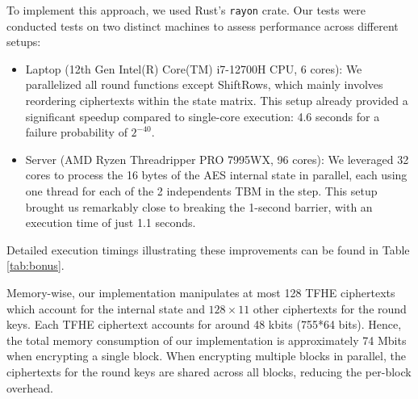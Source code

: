 To implement this approach, we used Rust's \texttt{rayon} crate. Our tests were conducted tests on two distinct machines to assess performance across different setups:
\begin{itemize}
\item Laptop (12th Gen Intel(R) Core(TM) i7-12700H CPU, 6 cores): We parallelized all round functions except ShiftRows, which mainly involves reordering ciphertexts within the state matrix. This setup already provided a significant speedup compared to single-core execution: 4.6 seconds for a failure probability of $2^{-40}$.
\item Server (AMD Ryzen Threadripper PRO 7995WX, 96 cores): We leveraged 32 cores to process the 16 bytes of the \gls{AES} internal state in parallel, each using one thread for each of the 2 independents \gls{TBM} in the \SubBytes step. This setup brought us remarkably close to breaking the 1-second barrier, with an execution time of just 1.1 seconds.
\end{itemize}
%
%
%
Detailed execution timings illustrating these improvements can be found in Table \ref{tab:bonus}.


 Memory-wise, our implementation manipulates at most 128 \gls{TFHE} ciphertexts which account for the internal state and $128 \times 11$ other ciphertexts for the round keys. Each \gls{TFHE} ciphertext accounts for around 48 kbits (755*64 bits). Hence, the total memory consumption of our implementation is approximately 74 Mbits when encrypting a single block. When encrypting multiple blocks in parallel, the ciphertexts for the round keys are shared across all blocks, reducing the per-block overhead.



